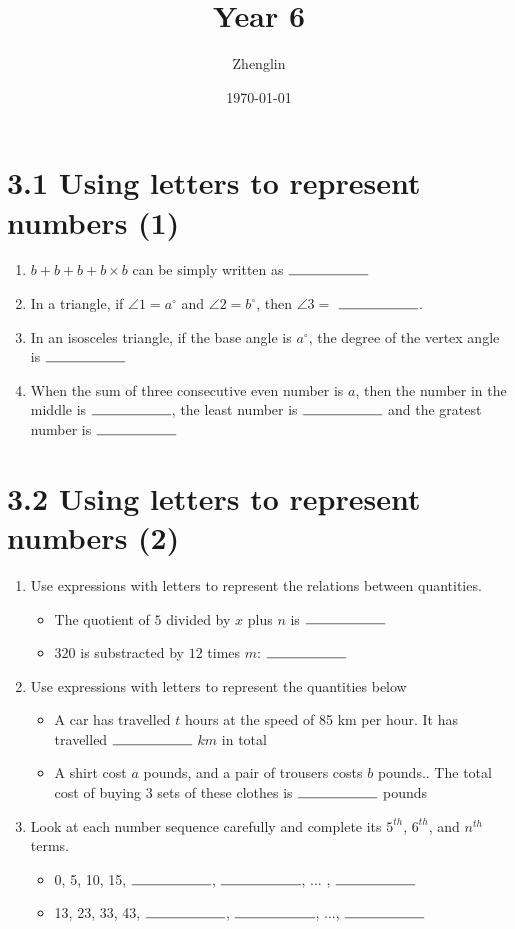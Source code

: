 \documentclass{article}%
\title{Year 6}%
\author{Zhenglin}%
\date{\today}%
\begin{document}
%
\normalsize%
\maketitle%
\section*{3.1 Using letters to represent numbers (1)}%
\begin{enumerate}%
\item%
$b+b+b+b\times b$ can be simply written as $\rule{2cm}{0.15mm}$%
\item%
In a triangle, if $\angle 1=a^{\circ}$ and $\angle 2=b^{\circ}$, then $\angle 3=$ $\rule{2cm}{0.15mm}$.%
\item%
In an isosceles triangle, if the base angle is $a^{\circ}$, the degree of the vertex angle is $\rule{2cm}{0.15mm}$%
\item%
When the sum of three consecutive even number is $a$, then the number in the middle is $\rule{2cm}{0.15mm}$, the least number is $\rule{2cm}{0.15mm}$ and the gratest number is $\rule{2cm}{0.15mm}$%
\end{enumerate}

%
\section*{3.2 Using letters to represent numbers (2)}%
\begin{enumerate}%
\item%
Use expressions with letters to represent the relations between quantities.%
\begin{itemize}%
\item%
The quotient of $5$ divided by $x$ plus $n$ is $\rule{2cm}{0.15mm}$%
\item%
$320$ is substracted by $12$ times $m$: $\rule{2cm}{0.15mm}$%
\end{itemize}%
\item%
Use expressions with letters to represent the quantities below%
\begin{itemize}%
\item%
A car has travelled $t$ hours at the speed of 85 km per hour. It has travelled $\rule{2cm}{0.15mm}$ $km$ in total%
\item%
A shirt cost $a$ pounds, and a pair of trousers costs $b$ pounds.. The total cost of buying 3 sets of these clothes is $\rule{2cm}{0.15mm}$ pounds%
\end{itemize}%
\item%
Look at each number sequence carefully and complete its $5^{th}$, $6^{th}$, and $n^{th}$ terms.%
\begin{itemize}%
\item%
0, 5, 10, 15, $\rule{2cm}{0.15mm}$, $\rule{2cm}{0.15mm}$, ... , $\rule{2cm}{0.15mm}$%
\item%
13, 23, 33, 43, $\rule{2cm}{0.15mm}$, $\rule{2cm}{0.15mm}$, ..., $\rule{2cm}{0.15mm}$%
\end{itemize}%
\end{enumerate}
\end{document}
